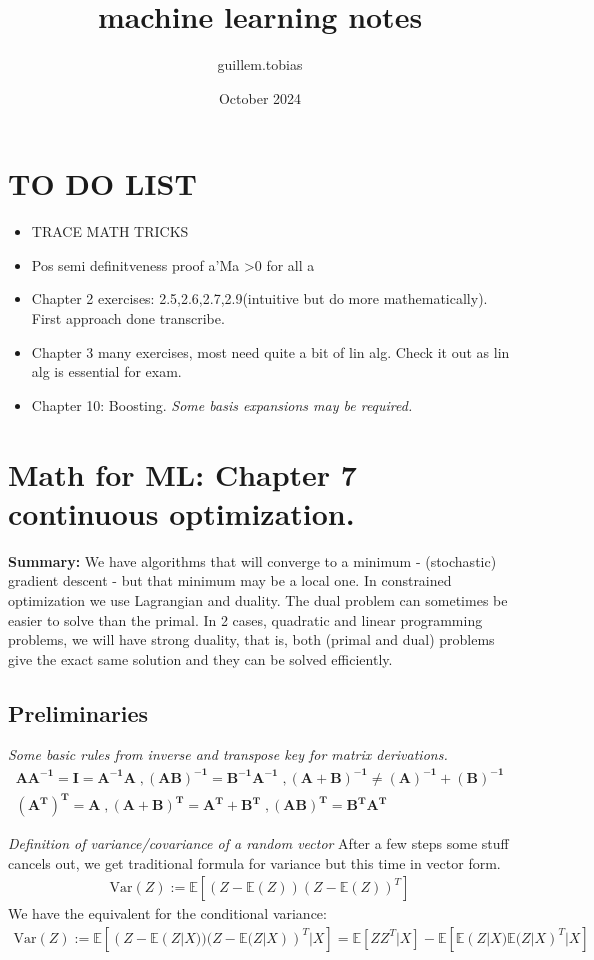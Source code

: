 \documentclass{article}
\begin{document}
\title{machine learning notes}
\author{guillem.tobias }
\date{October 2024}


\maketitle
\section{TO DO LIST}
\begin{itemize}
    \item TRACE MATH TRICKS 
    \item Pos semi definitveness proof a'Ma >0 for all a
    \item Chapter 2 exercises: 2.5,2.6,2.7,2.9(intuitive but do more mathematically). First approach done transcribe.
    \item Chapter 3 many exercises, most need quite a bit of lin alg. Check it out as lin alg is essential for exam. 
    \item Chapter 10: Boosting. \textit{Some basis expansions may be required.}
\end{itemize}

\section*{Math for ML: Chapter 7 continuous optimization.}
\textbf{Summary:} We have algorithms that will converge to a minimum - (stochastic) gradient descent - but that minimum may be a local one. 
In constrained optimization we use Lagrangian and duality. The dual problem can sometimes be easier to solve than the primal. 
In 2 cases, quadratic and linear programming problems, we will have strong duality, that is, both (primal and dual) problems give 
the exact same solution and they can be solved efficiently.  

\subsection*{Preliminaries}
\textit{Some basic rules from inverse and transpose key for matrix derivations.}
\begin{align*}
\mathbf{A A^{-1} = I = A^{-1} A \;, (AB)^{-1} = B^{-1}A^{-1} \;, (A + B)^{-1} \neq (A)^{-1} + (B)^{-1}}
\\
\mathbf{(A^T)^T = A \;, (A+B)^T = A^T + B^T \;,(AB)^T = B^T A^T}
\end{align*}

\textit{Definition of variance/covariance of a random vector}
After a few steps some stuff cancels out, we get traditional formula for variance
but this time in vector form.
\begin{align*}
\text{Var}(Z) := \mathbb{E}[(Z - \mathbb{E}(Z) )(Z - \mathbb{E}(Z))^T] 
\end{align*}
We have the equivalent for the conditional variance: 
\begin{align*}
    \text{Var}(Z) := \mathbb{E}[(Z - \mathbb{E}(Z|X) )(Z - \mathbb{E}(Z|X))^T|X]
    = \mathbb{E}[ZZ^T|X] - \mathbb{E}[\mathbb{E}(Z|X)\mathbb{E}(Z|X)^T|X]
\end{align*}
\end{document}

